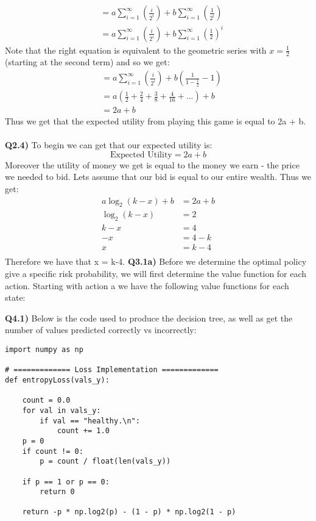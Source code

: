 \documentclass{article}
\begin{document}
\begin{titlepage}
\begin{align*}
&= a\sum^\infty_{i=1}(\frac{i}{2^i}) + b\sum^\infty_{i=1}(\frac{1}{2^i})\\
&= a\sum^\infty_{i=1}(\frac{i}{2^i}) + b\sum^\infty_{i=1}(\frac{1}{2})^i
\end{align*}
Note that the right equation is equivalent to the geometric series with $x = \frac{1}{2}$ (starting at the second term) and so we get:
\begin{align*}
&= a\sum^\infty_{i=1}(\frac{i}{2^i}) + b (\frac{1}{1-\frac{1}{2}}-1) \\
&= a \left(\frac{1}{2} + \frac{2}{4} + \frac{3}{8} + \frac{4}{16} + ... \right) + b \\
&= 2a + b
\end{align*}
Thus we get that the expected utility from playing this game is equal to 2a + b.\\\\
\textbf{Q2.4)} To begin we can get that our expected utility is:
\[ \text{Expected Utility} = 2a + b \]
Moreover the utility of money we get is equal to the money we earn - the price we needed to bid. Lets assume that our bid is equal to our entire wealth. Thus we get:
\begin{align*}
 a\log_2(k-x)+b &= 2a + b\\
 \log_2(k-x) &= 2\\
 k-x &= 4\\
 -x &= 4-k\\
 x &= k-4\\
\end{align*}
Therefore we have that x = k-4.
\newpage
\textbf{Q3.1a)} Before we determine the optimal policy give a specific risk probability, we will first determine the value function for each action. Starting with action a we have the following value functions for each state:

\newpage
\textbf{Q4.1)} Below is the code used to produce the decision tree, as well as get the number of values predicted correctly vs incorrectly:
\begin{lstlisting}
import numpy as np

# ============= Loss Implementation =============
def entropyLoss(vals_y):

    count = 0.0
    for val in vals_y:
        if val == "healthy.\n":
            count += 1.0
    p = 0
    if count != 0:
        p = count / float(len(vals_y))

    if p == 1 or p == 0:
        return 0

    return -p * np.log2(p) - (1 - p) * np.log2(1 - p)


\end{lstlisting}
\end{titlepage}
\end{document}

